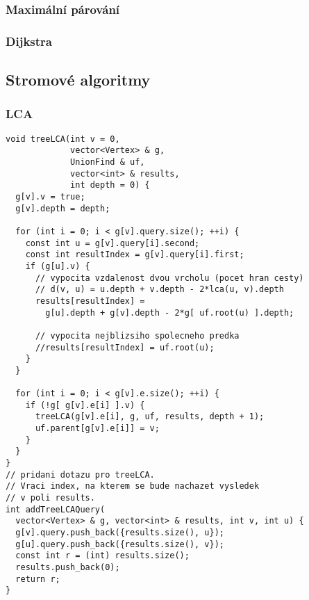 \documentclass{article}
\begin{document}
\subsubsection{Maximální párování}


\subsubsection{Dijkstra}


\subsection{Stromové algoritmy}
\subsubsection{LCA}
\begin{lstlisting}
void treeLCA(int v = 0, 
             vector<Vertex> & g,
             UnionFind & uf,
             vector<int> & results,
             int depth = 0) {
  g[v].v = true;
  g[v].depth = depth;

  for (int i = 0; i < g[v].query.size(); ++i) {
    const int u = g[v].query[i].second;
    const int resultIndex = g[v].query[i].first;
    if (g[u].v) {
      // vypocita vzdalenost dvou vrcholu (pocet hran cesty)
      // d(v, u) = u.depth + v.depth - 2*lca(u, v).depth
      results[resultIndex] = 
        g[u].depth + g[v].depth - 2*g[ uf.root(u) ].depth;

      // vypocita nejblizsiho spolecneho predka
      //results[resultIndex] = uf.root(u);
    }
  }

  for (int i = 0; i < g[v].e.size(); ++i) {
    if (!g[ g[v].e[i] ].v) {
      treeLCA(g[v].e[i], g, uf, results, depth + 1);
      uf.parent[g[v].e[i]] = v;
    }
  }
}
// pridani dotazu pro treeLCA. 
// Vraci index, na kterem se bude nachazet vysledek
// v poli results.
int addTreeLCAQuery(
  vector<Vertex> & g, vector<int> & results, int v, int u) {
  g[v].query.push_back({results.size(), u});
  g[u].query.push_back({results.size(), v});
  const int r = (int) results.size();
  results.push_back(0);
  return r;
}
\end{lstlisting}
\end{document}

